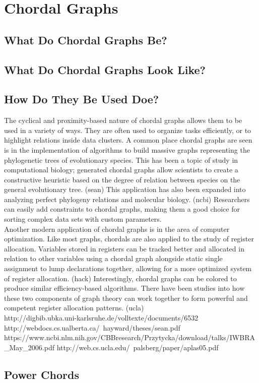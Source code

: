 \chapter{Chordal Graphs}
\section{What Do Chordal Graphs Be?}

\section{What Do Chordal Graphs Look Like?}

\section{How Do They Be Used Doe?}
The cyclical and proximity-based nature of chordal graphs allows them to be used in a variety of ways. They are often used to organize 
tasks efficiently, or to highlight relations inside data clusters. A common place chordal graphs are seen is in the implementation of algorithms to build 
massive graphs representing the phylogenetic trees of evolutionary species. This has been a topic of study in computational biology; generated chordal 
graphs allow scientists to create a constructive heuristic based on the degree of relation between species on the general evolutionary tree. (sean) This
application has also been expanded into analyzing perfect phylogeny relations and molecular biology. (ncbi) Researchers can easily add constraints to 
chordal graphs, making them a good choice for sorting complex data sets with custom parameters. \\

	Another modern application of chordal graphs is in the area of computer optimization. Like most graphs, chordals are also applied to the study of 
register allocation. Variables stored in registers can be tracked better and allocated in relation to other variables using a chordal graph alongside
static single assignment to lump declarations together, allowing for a more optimized system of register allocation. (hack) Interestingly, chordal graphs
can be colored to produce similar efficiency-based algorithms. There have been studies into how these two components of graph theory can work together to 
form powerful and competent register allocation patterns. (ucla) \\

http://digbib.ubka.uni-karlsruhe.de/volltexte/documents/6532
http://webdocs.cs.ualberta.ca/~hayward/theses/sean.pdf
https://www.ncbi.nlm.nih.gov/CBBresearch/Przytycka/download/talks/IWBRA_May_2006.pdf
http://web.cs.ucla.edu/~palsberg/paper/aplas05.pdf

\section{Power Chords}
